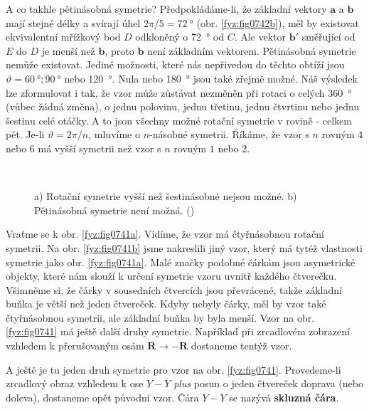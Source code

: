     A co takhle pětinásobná symetrie? Předpokládáme-li, že základní vektory \(\bm{a}\) a \(\bm{b}\) 
    mají stejné délky a svírají úhel \(2\pi /5 = \SI{72}{\degree}\) (obr. \ref{fyz:fig0742b}), měl 
    by existovat ekvivalentní mřížkový bod \(D\) odkloněný o \SI{72}{\degree} od \(C\). Ale vektor 
    \(\bm{b'}\) směřující od \(E\) do \(D\) je menší než \(\bm{b}\), proto \(\bm{b}\) není 
    základním vektorem. Pětinásobná symetrie nemůže existovat. Jediné možnosti, které nás 
    nepřivedou do těchto obtíží jsou \(\vartheta = \SI{60}{\degree}; \SI{90}{\degree}\) nebo 
    \SI{120}{\degree}. Nula nebo \SI{180}{\degree} jsou také zřejmě možné. Náš výsledek lze 
    zformulovat i tak, že vzor může zůstávat nezměněn při rotaci o celých \SI{360}{\degree} (vůbec 
    žádná změna), o jednu polovinu, jednu třetinu, jednu čtvrtinu nebo jednu šestinu celé otáčky. A 
    to jsou všechny možné rotační symetrie v rovině - celkem pět. Je-li \(\vartheta = 2\pi/n\), 
    mluvíme o \(n\)-násobné symetrii. Říkáme, že vzor s \(n\) rovným \(4\) nebo \(6\) má vyšší 
    symetrii než vzor s \(n\) rovným \(1\) nebo \(2\). 

    \begin{figure}[ht!]    %
      \centering
                     \\
      \caption{a) Rotační symetrie vyšší než šestinásobné nejsou možné. b) Pětinásobná symetrie 
               není možná.
               (\cite[s.~550]{Feynman02})}
      \label{fyz:fig0742}
    \end{figure}

    Vraťme se k obr. \ref{fyz:fig0741a}. Vidíme, že vzor má čtyřnásobnou rotační symetrii. Na obr. 
    \ref{fyz:fig0741b} jsme nakreslili jiný vzor, který má tytéž vlastnosti symetrie jako obr. 
    \ref{fyz:fig0741a}. Malé značky podobné čárkám jsou asymetrické objekty, které nám slouží k 
    určení symetrie vzoru uvnitř každého čtverečku. Všimněme si, že čárky v sousedních čtvercích 
    jsou převrácené, takže základní buňka je větší než jeden čtvereček. Kdyby nebyly čárky, měl by 
    vzor také čtyřnásobnou symetrii, ale základní buňka by byla menší. Vzor na obr. 
    \ref{fyz:fig0741} má ještě další druhy symetrie. Například při zrcadlovém zobrazení vzhledem k 
    přerušovaným osám \(\bm{R} \rightarrow \bm{-R}\) dostaneme tentýž vzor. 

    A ještě je tu jeden druh symetrie pro vzor na obr. \ref{fyz:fig0741}. Provedeme-li zrcadlový 
    obraz vzhledem k ose \(Y-Y\) \emph{plus} posun o jeden čtvereček doprava (nebo doleva), 
    dostaneme opět původní vzor. Čára \(Y-Y\) se nazývá \textbf{skluzná čára}.

